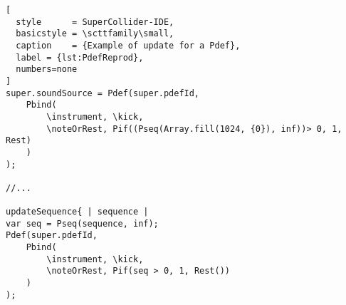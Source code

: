 \documentclass[main.tex]{subfiles}
\begin{document}
\begin{lstlisting}[
  style      = SuperCollider-IDE,
  basicstyle = \scttfamily\small,
  caption    = {Example of update for a Pdef},
  label = {lst:PdefReprod},
  numbers=none
]
super.soundSource = Pdef(super.pdefId,
	Pbind(
		\instrument, \kick,
		\noteOrRest, Pif((Pseq(Array.fill(1024, {0}), inf))> 0, 1, Rest)
	)
);

//...

updateSequence{ | sequence |
var seq = Pseq(sequence, inf);
Pdef(super.pdefId,
	Pbind(
		\instrument, \kick,
		\noteOrRest, Pif(seq > 0, 1, Rest())
	)
);

\end{lstlisting}
\end{document}
